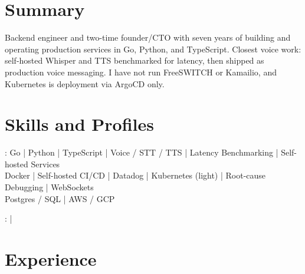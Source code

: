 \documentclass[print]{jack-resume}
\begin{document}
\pagecolor{darkmodeBackground}


\begin{minipage}[t][1cm][t]{.03\textwidth}
    \hfill
\end{minipage}

\section{Summary}
Backend engineer and two-time founder/CTO with seven years of building and operating production services in Go, Python, and TypeScript. Closest voice work: self-hosted Whisper and TTS benchmarked for latency, then shipped as production voice messaging. I have not run FreeSWITCH or Kamailio, and Kubernetes is deployment via ArgoCD only.
\sectionsep

\section{Skills and Profiles}
:
Go \hfill | \hfill
Python \hfill | \hfill
TypeScript \hfill | \hfill
Voice / STT / TTS \hfill | \hfill
Latency Benchmarking \hfill | \hfill
Self-hosted Services \\
\hspace{1.0cm} Docker \hfill | \hfill
Self-hosted CI/CD \hfill | \hfill
Datadog \hfill | \hfill
Kubernetes (light) \hfill | \hfill
Root-cause Debugging \hfill | \hfill
WebSockets \\
\hspace{1.0cm} Postgres / SQL \hfill | \hfill
AWS / GCP \\

\raggedright{
    :
      \href{https://www.linkedin.com/in/jack-sturtevant/}{ \ExternalLink} |
     \href{https://github.com/jacksturt}{ \ExternalLink}}

\section{Experience}
\end{document}
